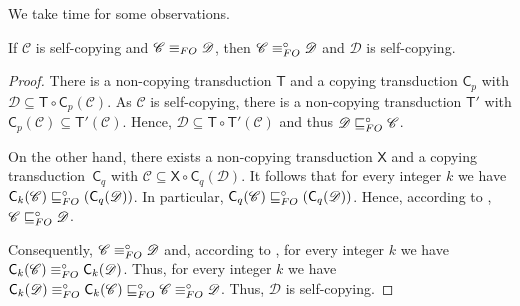 \documentclass{lmcs}
\newcommand{\Cc}{\mathscr{C}}
\newcommand{\Dd}{\mathscr{D}}
\renewcommand{\FO}{{\rm FO}}
\theoremstyle{definition}
\newcommand{\dnnc}{is self-copying\xspace}
\begin{document}
\pagebreak
We take time for some observations.

\begin{lem}
	If $\Cc$ \dnnc and $\Cc\equiv_\FO\Dd$, then $\Cc\equiv_\FO^\circ\Dd$ and $\Dd$ \dnnc.
\end{lem}
\begin{proof}
	There is a non-copying transduction $\mathsf T$ and a copying transduction $\mathsf C_p$ with $\Dd\subseteq\mathsf T\circ\mathsf C_p(\Cc)$. 
	As $\Cc$ \dnnc, there is a non-copying transduction $\mathsf T'$ with $\mathsf C_p(\Cc)\subseteq\mathsf T'(\Cc)$. Hence, $\Dd\subseteq \mathsf T\circ\mathsf T'(\Cc)$ and thus $\Dd\sqsubseteq_\FO^\circ\Cc$. 
	
	On the other hand, there exists   a non-copying transduction $\mathsf X$ and a copying transduction~$\mathsf C_q$ with $\Cc\subseteq\mathsf X\circ\mathsf C_q(\Dd)$. It follows that for every integer $k$ we have
	$\mathsf C_k(\Cc)\sqsubseteq_\FO^\circ(\mathsf C_q(\Dd))$.
	In particular, $\mathsf C_q(\Cc)\sqsubseteq_\FO^\circ(\mathsf C_q(\Dd))$. Hence, according to ,  $\Cc\sqsubseteq_\FO^\circ\Dd$.
	
	Consequently, $\Cc\equiv_\FO^\circ\Dd$ and, according to ,
	for every integer $k$ we have
	$\mathsf C_k(\Cc)\equiv_\FO^\circ \mathsf C_k(\Dd)$.
	Thus, for every integer $k$ we have
	$\mathsf C_k(\Dd)\equiv_\FO^\circ \mathsf C_k(\Cc)
	\sqsubseteq_\FO^\circ \Cc\equiv_\FO^\circ\Dd$. Thus, $\Dd$ \dnnc.
\end{proof}
\end{document}
